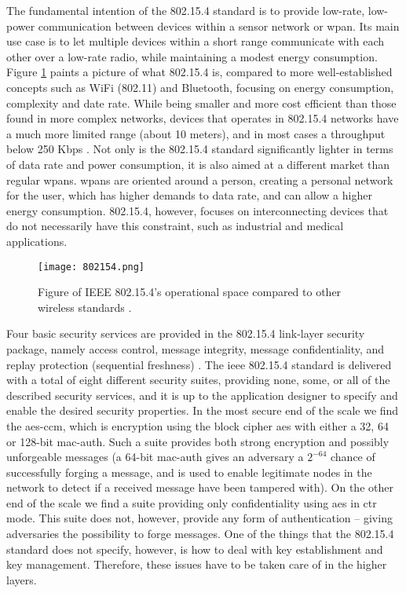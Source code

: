 The fundamental intention of the 802.15.4 standard is to provide low-rate, low-power communication between devices within a sensor network or \gls{wpan}. Its main use case is to let multiple devices within a short range communicate with each other over a low-rate radio, while maintaining a modest energy consumption. Figure \ref{fig:802154-figure} paints a picture of what 802.15.4 is, compared to more well-established concepts such as WiFi (802.11) and Bluetooth, focusing on energy consumption, complexity and date rate. While being smaller and more cost efficient than those found in more complex networks, devices that operates in 802.15.4 networks have a much more limited range (about 10 meters), and in most cases a throughput below 250 Kbps \cite{gutierrez2001ieee}. Not only is the 802.15.4 standard significantly lighter in terms of data rate and power consumption, it is also aimed at a different market than regular \gls{wpan}s. \gls{wpan}s are oriented around a person, creating a personal network for the user, which has higher demands to data rate, and can allow a higher energy consumption. 802.15.4, however, focuses on interconnecting devices that do not necessarily have this constraint, such as industrial and medical applications. 


\begin{figure}[h]
	\centering
	\texttt{[image: 802154.png]}
	\caption[Figure of IEEE 802.15.4's operational space compared to other wireless standards.]{Figure of IEEE 802.15.4's operational space compared to other wireless standards \cite{gutierrez2001ieee}.}
	\label{fig:802154-figure}
\end{figure}

Four basic security services are provided in the 802.15.4 link-layer security package, namely access control, message integrity, message confidentiality, and replay protection (sequential freshness) \cite{sastry2004security}. The \gls{ieee} 802.15.4 standard is delivered with a total of eight different security suites, providing none, some, or all of the described security services, and it is up to the application designer to specify and enable the desired security properties. In the most secure end of the scale we find the \gls{aes}-\gls{ccm}, which is encryption using the block cipher \gls{aes} with either a 32, 64 or 128-bit \gls{mac-auth}. Such a suite provides both strong encryption and possibly unforgeable messages (a 64-bit \gls{mac-auth} gives an adversary a $2^{-64}$ chance of successfully forging a message, and is used to enable legitimate nodes in the network to detect if a received message have been tampered with). On the other end of the scale we find a suite providing only confidentiality using \gls{aes} in \gls{ctr} mode. This suite does not, however, provide any form of authentication -- giving adversaries the possibility to forge messages. One of the things that the 802.15.4 standard does not specify, however, is how to deal with key establishment and key management. Therefore, these issues have to be taken care of in the higher layers.


